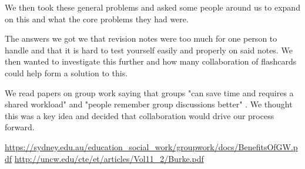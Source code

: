 \documentclass{article}
\begin{document}
We then took these general problems and asked some people around us to expand on this and what the core problems they had were.

The answers we got we that revision notes were too much for one person to handle and that it is hard to test yourself easily and properly on said notes.
We then wanted to investigate this further and how many collaboration of flashcards could help form a solution to this.

We read papers on group work saying that groups "can save time and requires a shared workload" \cite{groupwork1} and "people remember group discussions better" \cite{groupwork2}. We thought this was a key idea and decided that collaboration would drive our process forward.

\begin{thebibliography}{2}
		\url{https://sydney.edu.au/education_social_work/groupwork/docs/BenefitsOfGW.pdf}
		\url{http://uncw.edu/cte/et/articles/Vol11_2/Burke.pdf}
\end{thebibliography}
\end{document}
